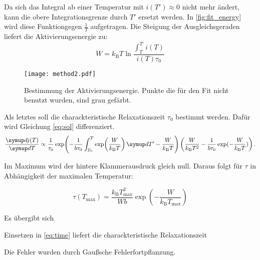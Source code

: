  Da sich das Integral ab einer Temperatur mit $i(T') \approx 0$ nicht mehr ändert,
kann die obere Integrationsgrenze durch $T'$ ersetzt werden.
In \autoref{fig:fit_energy} wird diese Funktiongegen $\frac{1}{T}$ aufgetragen.
Die Steigung der Ausgleichsgeraden liefert die Aktivierungsenergie zu:
\begin{equation}
  
\end{equation}
\begin{equation}
  W = k_\text{B} T \ln \frac{\int_T^{T'} i(T)}{ i(T) \tau_0}
  \label{eq:final}
\end{equation}


\begin{figure}
  \centering
  \texttt{[image: method2.pdf]}
  \caption{Bestimmung der Aktivierungsenergie. Punkte die für den Fit nicht benutzt wurden, sind grau gefärbt.}
  \label{fig:fit_energy}
\end{figure}


Als letztes soll die charackteristische Relaxationszeit $\tau_0$ bestimmt werden. Dafür wird Gleichung \eqref{eq:sol} differenziert.
\begin{equation}
  \label{eq:crazy}
  \dd{j(T)}{T} \propto
    \frac{1}{\tau_0}
    \exp\!\left(
      -\frac{1}{b\tau_0} \int_{T_0}^{T} \exp\! \left( \frac{W}{k_\text{B} T} \right)  \dif{T'} - \frac{W}{k_\text{B} T}
    \right) \left( \frac{W}{k_\text{B} T^2} -   \frac{1}{b\tau_0}\exp(-\frac{W}{k_\text{B} T}) \right).
\end{equation}

Im Maximum wird der hintere Klammerausdruck gleich null. Daraus folgt für $\tau$ in Abhängigkeit der maximalen Temperatur:

\begin{equation}
  \label{eq:tau}
  \tau(T_\text{max}) = \frac{k_\text{B} T_\text{max}^2}{W b} \exp\left(-\frac{W}{k_\text{B} T_\text{max}} \right)
\end{equation}

Es übergibt sich
\begin{equation}
  
\end{equation}

Einsetzen in \eqref{eq:time} liefert die  charackteristische Relaxationszeit
\begin{equation}
  
\end{equation}

Die Fehler wurden durch Gaußsche Fehlerfortpflanzung.
